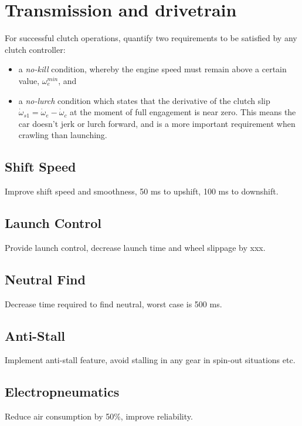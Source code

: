 \section{Transmission and drivetrain}

For successful clutch operations, \citet{clutch_control} quantify two requirements to be satisfied by any clutch controller:
\begin{itemize}
  \item a \emph{no-kill} condition, whereby the engine speed must remain above a certain value, $\omega_e^{min}$, and
  \item a \emph{no-lurch} condition which states that the derivative of the clutch slip $\dot{\omega}_{s1}=\dot{\omega}_e-\dot{\omega}_c$ at the moment of full engagement is near zero. This means the car doesn't jerk or lurch forward, and is a more important requirement when crawling than launching.
\end{itemize}



\subsection{Shift Speed}

Improve shift speed and smoothness, 50 ms to upshift, 100 ms to downshift.


\subsection{Launch Control}

Provide launch control, decrease launch time and wheel slippage by
xxx.


\subsection{Neutral Find}

Decrease time required to find neutral, worst case is 500 ms.


\subsection{Anti-Stall}

Implement anti-stall feature, avoid stalling in any gear in spin-out
situations etc.


\subsection{Electropneumatics}

Reduce air consumption by 50\%, improve reliability. 